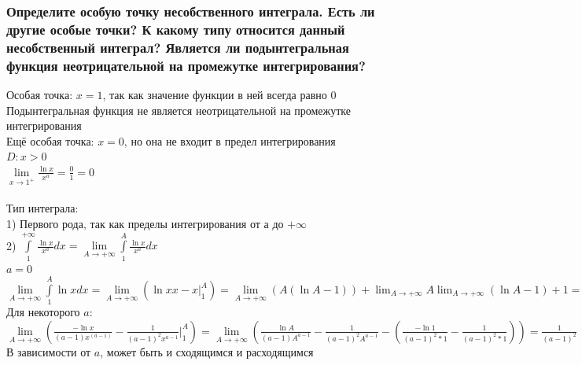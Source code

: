 \documentclass{article}
\begin{document}
\subsubsection{Определите особую точку несобственного интеграла. Есть ли другие особые точки? К какому типу относится данный несобственный интеграл? Является ли подынтегральная функция неотрицательной на промежутке интегрирования?}
Особая точка: $ x = 1 $, так как значение функции в ней всегда равно $ 0 $\\
Подынтегральная функция не является неотрицательной на промежутке интегрирования\\
Ещё особая точка: $ x = 0 $, но она не входит в предел интегрирования\\
$ D: x > 0 $\\
$ \lim\limits_{x\to 1^{+}} \frac{\ln{x}}{x^a} = \frac{0}{1} = 0 $\\\\
Тип интеграла:\\
1) Первого рода, так как пределы интегрирования от $ а $ до $ +\infty $\\
2) $ \int\limits^{+\infty}_{1} \frac{\ln{x}}{x^a}dx = \lim\limits_{A\to +\infty} \int\limits^A_1 \frac{\ln{x}}{x^a}dx $\\
$ a = 0 $\\
$ \lim\limits_{A\to +\infty} \int\limits^A_1 \ln{x}dx = \lim\limits_{A\to +\infty}(\ln{x}x - x |^A_1) = \lim\limits_{A\to +\infty} (A (\ln{A} - 1)) + \lim_{A\to +\infty} A \lim_{A\to +\infty} (\ln{A} - 1) + 1 = +\infty $\\
Для некоторого $ a $:\\
$ \lim\limits_{A\to +\infty} (\frac{-\ln{x}}{(a-1)x^{(a-1)}} - \frac{1}{(a-1)^2 x^{a-1}} |^A_1) = \lim\limits_{A\to +\infty} (\frac{\ln{A}}{(a-1)A^{a-1}} - \frac{1}{(a-1)^2 A^{a-1}} - (\frac{-\ln{1}}{(a-1)^2 * 1} - \frac{1}{(a-1)^2 * 1})) = \frac{1}{(a-1)^2} $\\
В зависимости от $ a $, может быть и сходящимся и расходящимся
\end{document}
